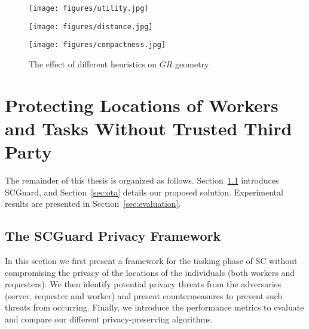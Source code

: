 \documentclass{USC-Thesis}
\newcommand{\SCG}{{SCGuard}}
\numberwithin{equation}{chapter}
\begin{document}
\begin{figure}[!ht]
	\centering
	\begin{minipage}[b]{0.25\linewidth}
		\texttt{[image: figures/utility.jpg]}
		\label{fig:utility}
	\end{minipage}
	\hspace{0.5cm}
	\centering
	\begin{minipage}[b]{0.25\linewidth}
		\texttt{[image: figures/distance.jpg]}
		\label{fig:distance}
	\end{minipage}
	\hspace{0.5cm}
	\centering
	\begin{minipage}[b]{0.26\linewidth}
		\texttt{[image: figures/compactness.jpg]}
		\label{fig:compactness}
	\end{minipage}
	\caption{The effect of different heuristics on $\mathit{GR}$ geometry}	
\label{fig:heuristics}
\end{figure}

\section{Protecting Locations of Workers and Tasks Without Trusted Third Party}
The remainder of this thesis is organized as follows.
Section~\ref{sec:framework} introduces \SCG, and Section~\ref{sec:ota} details our proposed solution. Experimental results are presented in Section~\ref{sec:evaluation}.

\subsection{The SCGuard Privacy Framework}
\label{sec:framework}
In this section we first present a framework for the tasking phase of SC without compromising the privacy of the locations of the individuals (both workers and requesters).
We then identify potential privacy threats from the adversaries (server, requester and worker) and present countermeasures to prevent such threats from occurring.
Finally, we introduce the performance metrics to evaluate and compare our different privacy-preserving algorithms.

\end{document}
